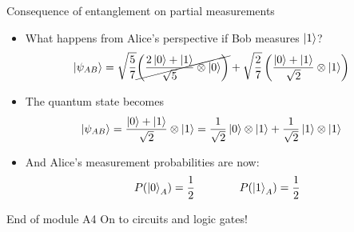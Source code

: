 \documentclass[aspectratio=169,12pt]{beamer}
\begin{document}
\begin{frame}{Consequence of entanglement on partial measurements}
  \begin{itemize}[<+->]
    \item What happens from Alice's perspective if Bob measures $\ket{1}$?
    \begin{align*}
      \ket{\psi_{AB}} 
      &= \sqrt{\frac{5}{7}} \cancel{\left( \frac{2\ket{0}+\ket{1}}{\sqrt{5}} \otimes \ket{0} \right)} + \sqrt{\frac{2}{7}} \left( \frac{\ket{0}+\ket{1}}{\sqrt{2}} \otimes \ket{1} \right)
    \end{align*}
    \item The quantum state becomes
    \begin{align*}
      \ket{\psi_{AB}} 
      &= \frac{\ket{0}+\ket{1}}{\sqrt{2}} \otimes \ket{1} = \frac{1}{\sqrt{2}} \ket{0} \otimes \ket{1} + \frac{1}{\sqrt{2}} \ket{1} \otimes \ket{1}
    \end{align*}
    \item And Alice's measurement probabilities are now:
    \begin{equation*}
      P(\ket{0}_A) = \frac{1}{2} \qquad\qquad P(\ket{1}_A) = \frac{1}{2}
    \end{equation*}
  \end{itemize}
\end{frame}

\begin{frame}{End of module A4}
    \centering
  \vfill
  On to circuits and logic gates!
  \vfill
\end{frame}
\end{document}
